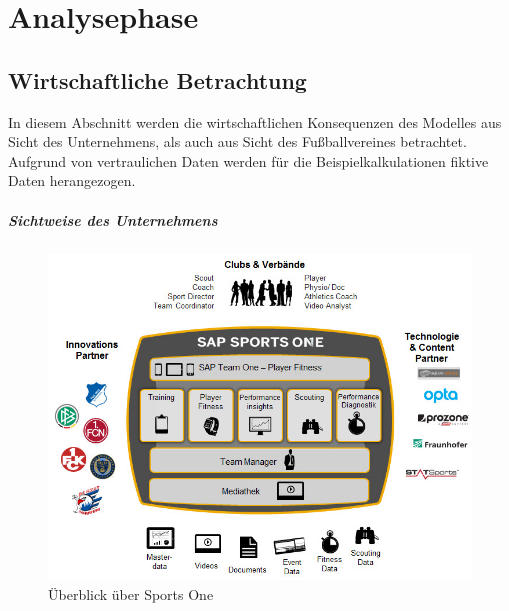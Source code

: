 \chapter{Analysephase}




\section{Wirtschaftliche Betrachtung}
\label{wa}
In diesem Abschnitt werden die wirtschaftlichen Konsequenzen des Modelles aus Sicht des Unternehmens, als auch aus Sicht des Fußballvereines betrachtet.\enlargethispage{2\baselineskip}  Aufgrund von vertraulichen Daten werden für die Beispielkalkulationen fiktive Daten herangezogen.

\paragraph{Sichtweise des Unternehmens}

\begin{figure}[H]
\centering
\includegraphics[scale=0.575]{se-wa-jpg/sportsone}
\caption{Überblick über Sports One}
\label{sportsone}
\end{figure}


